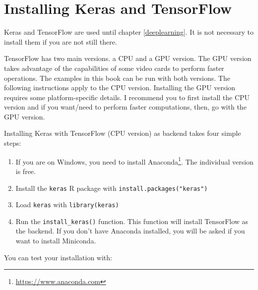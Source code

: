 \documentclass[
  11pt,
]{krantz}
\makeatletter
\newenvironment{Shaded}{\begin{snugshade}}{\end{snugshade}}
\newcommand{\CommentTok}[1]{\textcolor[rgb]{0.37,0.37,0.37}{\textit{#1}}}
\newcommand{\FunctionTok}[1]{\textcolor[rgb]{0,0,0}{#1}}
\newcommand{\NormalTok}[1]{#1}
\newcommand{\SpecialCharTok}[1]{\textcolor[rgb]{0,0,0}{#1}}
\newcommand{\StringTok}[1]{\textcolor[rgb]{0.5,0.5,0.5}{#1}}
\newenvironment{kframe}{%
\medskip{}
\setlength{\fboxsep}{.8em}
 \def\at@end@of@kframe{}%
 \ifinner\ifhmode%
  \def\at@end@of@kframe{\end{minipage}}%
  \begin{minipage}{\columnwidth}%
 \fi\fi%
 \def\FrameCommand##1{\hskip\@totalleftmargin \hskip-\fboxsep
 \colorbox{shadecolor}{##1}\hskip-\fboxsep
     \hskip-\linewidth \hskip-\@totalleftmargin \hskip\columnwidth}%
 \MakeFramed {\advance\hsize-\width
   \@totalleftmargin\z@ \linewidth\hsize
   \@setminipage}}%
 {\par\unskip\endMakeFramed%
 \at@end@of@kframe}
\newenvironment{rmdblock}[1]
  {
  \begin{itemize}
  \renewcommand{\labelitemi}{
    \raisebox{-.7\height}[0pt][0pt]{
      {\setkeys{Gin}{width=3em,keepaspectratio}\texttt{[image: images/icons/\#1]}}
    }
  }
  \setlength{\fboxsep}{1em}
  \begin{kframe}
  \item
  }
  {
  \end{kframe}
  \end{itemize}
  }
\newenvironment{rmdgoodpractice}
  {\begin{rmdblock}{goodpractice}}
  {\end{rmdblock}}
\makeatother
\begin{document}
\hypertarget{installing-keras-and-tensorflow}{%
\section{Installing Keras and TensorFlow}\label{installing-keras-and-tensorflow}}

\begin{rmdgoodpractice}
Keras and TensorFlow are used until chapter \ref{deeplearning}. It is not necessary to install them if you are not still there.
\end{rmdgoodpractice}

TensorFlow has two main versions. a CPU and a GPU version. The GPU version takes advantage of the capabilities of some video cards to perform faster operations. The examples in this book can be run with both versions. The following instructions apply to the CPU version. Installing the GPU version requires some platform-specific details. I recommend you to first install the CPU version and if you want/need to perform faster computations, then, go with the GPU version.

Installing Keras with TensorFlow (CPU version) as backend takes four simple steps:

\begin{enumerate}
\def\labelenumi{\arabic{enumi}.}
\item
  If you are on Windows, you need to install Anaconda\footnote{\url{https://www.anaconda.com}}. The individual version is free.
\item
  Install the \texttt{keras} R package with \texttt{install.packages("keras")}
\item
  Load \texttt{keras} with \texttt{library(keras)}
\item
  Run the \texttt{install\_keras()} function. This function will install TensorFlow as the backend. If you don't have Anaconda installed, you will be asked if you want to install Miniconda.
\end{enumerate}

You can test your installation with:

\begin{Shaded}
\end{Shaded}
\end{document}
